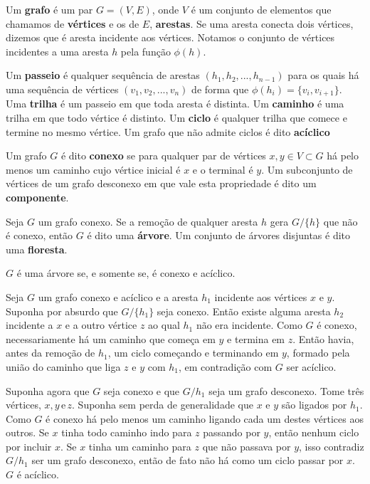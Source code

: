 \begin{defi}
Um \textbf{grafo} é um par $G = (V, E)$, onde $V$ é um conjunto de elementos que chamamos de \textbf{vértices} e os de $E$, \textbf{arestas}. Se uma aresta conecta dois vértices, dizemos que é aresta incidente aos vértices. Notamos o conjunto de vértices incidentes a uma aresta $h$ pela função $\phi(h)$.
\end{defi}

\begin{defi}
Um \textbf{passeio} é qualquer sequência de arestas $(h_1, h_2, ..., h_{n-1})$ para os quais há uma sequência de vértices $(v_1, v_2, ..., v_n)$ de forma que $\phi(h_i) = \{v_i, v_{i+1}\}$. Uma \textbf{trilha} é um passeio em que toda aresta é distinta. Um \textbf{caminho} é uma trilha em que todo vértice é distinto. Um \textbf{ciclo} é qualquer trilha que comece e termine no mesmo vértice. Um grafo que não admite ciclos é dito \textbf{acíclico}
\end{defi}

\begin{defi}
Um grafo $G$ é dito \textbf{conexo} se para qualquer par de vértices $x, y \in V \subset G$ há pelo menos um caminho cujo vértice inicial é $x$ e o terminal é $y$. Um subconjunto de vértices de um grafo desconexo em que vale esta propriedade é dito um \textbf{componente}.
\end{defi}


\begin{defi}
Seja $G$ um grafo conexo. Se a remoção de qualquer aresta $h$ gera $G / \{h\}$ que não é conexo, então $G$ é dito uma \textbf{árvore}. Um conjunto de árvores disjuntas é dito uma \textbf{floresta}.
\end{defi}

\begin{teo}
$G$ é uma árvore se, e somente se, é conexo e acíclico.
\end{teo}

\begin{prova}
Seja $G$ um grafo conexo e acíclico e a aresta $h_1$ incidente aos vértices $x$ e $y$. Suponha por absurdo que $G / \{h_1\}$ seja conexo. Então existe alguma aresta $h_2$ incidente a $x$ e a outro vértice $z$ ao qual $h_1$ não era incidente. Como $G$ é conexo, necessariamente há um caminho que começa em $y$ e termina em $z$. Então havia, antes da remoção de $h_1$, um ciclo começando e terminando em $y$, formado pela união do caminho que liga $z$ e $y$ com $h_1$, em contradição com $G$ ser acíclico.

Suponha agora que $G$ seja conexo e que $G / h_1$ seja um grafo desconexo. Tome três vértices, $x, y \,\text{e}\, z$. Suponha sem perda de generalidade que $x$ e $y$ são ligados por $h_1$. Como $G$ é conexo há pelo menos um caminho ligando cada um destes vértices aos outros. Se $x$ tinha todo caminho indo para $z$ passando por $y$, então nenhum ciclo por incluir $x$. Se $x$ tinha um caminho para $z$ que não passava por $y$, isso contradiz $G / h_1$ ser um grafo desconexo, então de fato não há como um ciclo passar por $x$. $G$ é acíclico. \blacksquare


\end{prova}

